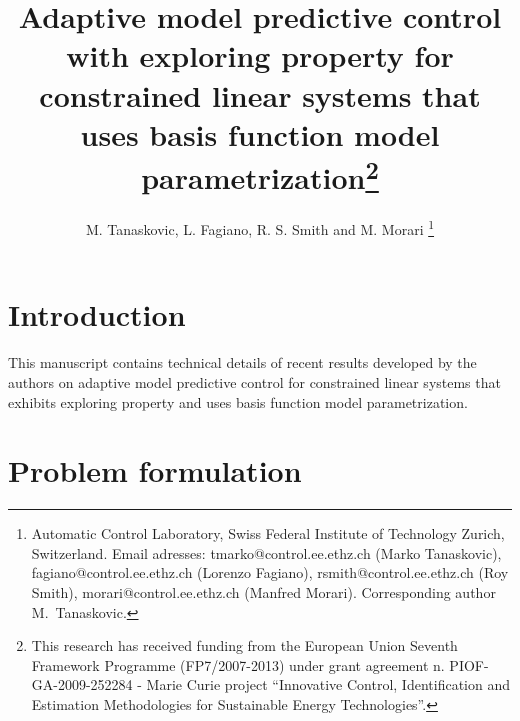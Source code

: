 \documentclass[10 pt, letterpaper]{article}
\begin{document}
\date{}

\title{Adaptive model predictive control with exploring property for constrained linear systems that uses basis function model parametrization\thanks{This research has received funding from the European Union Seventh Framework Programme (FP7/2007-2013) under grant agreement n. PIOF-GA-2009-252284 - Marie Curie project ``Innovative Control, Identification and Estimation Methodologies for Sustainable Energy Technologies''.}}
\author{M. Tanaskovic, L. Fagiano, R. S. Smith and  M. Morari \thanks{Automatic Control Laboratory, Swiss Federal Institute of Technology Zurich, Switzerland. Email adresses: tmarko@control.ee.ethz.ch (Marko Tanaskovic),  fagiano@control.ee.ethz.ch (Lorenzo Fagiano), rsmith@control.ee.ethz.ch (Roy Smith), morari@control.ee.ethz.ch (Manfred Morari). Corresponding author M.~Tanaskovic.}}


\maketitle


\section{Introduction}
This manuscript contains technical details of recent results developed by the authors on adaptive model predictive control for constrained linear systems that exhibits exploring property and uses basis function model parametrization.


\section{Problem formulation}

\label{S:problem}
\end{document}
